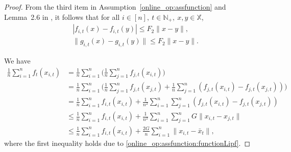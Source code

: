 \documentclass[12pt,draftcls,onecolumn]{IEEEtran}%
\begin{document}
\begin{proof}

From the third item in Assumption~\ref{online_op:assfunction} and Lemma~2.6 in \cite{shalev2012online}, it follows that for all $i\in[n],~t\in\mathbb{N}_+,~x,y\in \mathbb{X}$,
\begin{subequations}
\begin{align}
&\left|f_{i,t}(x)-f_{i,t}(y)\right|\le F_2\|x-y\|,\label{online_op:assfunction:functionLipf}\\
      &\|g_{i,t}(x)-g_{i,t}(y)\|\le F_2\|x-y\|.\label{online_op:assfunction:functionLipg}
\end{align}
\end{subequations}

We have
\begin{align}\label{online_op:lxit}
\frac{1}{n}\sum_{i=1}^{n}f_t(x_{i,t})
&=\frac{1}{n}\sum_{i=1}^{n}\Big(\frac{1}{n}\sum_{j=1}^{n}f_{j,t}(x_{i,t})\Big)\nonumber\\
&=\frac{1}{n}\sum_{i=1}^{n}\Big(\frac{1}{n}\sum_{j=1}^{n}f_{j,t}(x_{j,t})
+\frac{1}{n}\sum_{j=1}^{n}
(f_{j,t}(x_{i,t})-f_{j,t}(x_{j,t}))\Big)\nonumber\\
&=\frac{1}{n}\sum_{i=1}^{n}f_{i,t}(x_{i,t})
+\frac{1}{n^2}\sum_{i=1}^{n}\sum_{j=1}^{n}
(f_{j,t}(x_{i,t})-f_{j,t}(x_{j,t}))\nonumber\\
&\le\frac{1}{n}\sum_{i=1}^{n}f_{i,t}(x_{i,t})
+\frac{1}{n^2}\sum_{i=1}^{n}\sum_{j=1}^{n}
G\|x_{i,t}-x_{j,t}\|\nonumber\\
&\le\frac{1}{n}\sum_{i=1}^{n}f_{i,t}(x_{i,t})+\frac{2G}{n}\sum_{i=1}^{n}
\|x_{i,t}-\bar{x}_{t}\|,
\end{align}
where the first inequality holds due to \eqref{online_op:assfunction:functionLipf}.


\end{proof}
\end{document}
